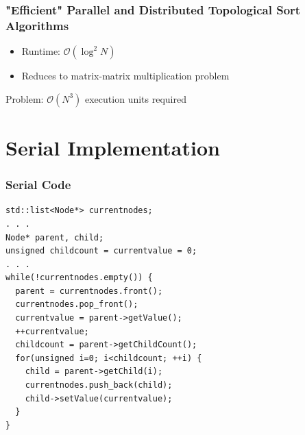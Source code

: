 \begin{frame}
\frametitle{"Efficient" Parallel and Distributed Topological Sort Algorithms}

\begin{itemize}
	\item Runtime: $\mathcal{O} (\log^2 N)$
	\item Reduces to matrix-matrix multiplication problem
\end{itemize}

\begin{block}{Problem:}
	$\mathcal{O} (N^3)$ execution units required
\end{block}


\end{frame}




\section{Serial Implementation}

\begin{frame}[fragile]
	\frametitle{Serial Code}
	\begin{lstlisting}[style=cpp]
std::list<Node*> currentnodes;
. . .
Node* parent, child;
unsigned childcount = currentvalue = 0;
. . .
while(!currentnodes.empty()) {
  parent = currentnodes.front();
  currentnodes.pop_front();
  currentvalue = parent->getValue();
  ++currentvalue;
  childcount = parent->getChildCount();
  for(unsigned i=0; i<childcount; ++i) {
    child = parent->getChild(i);
    currentnodes.push_back(child);
    child->setValue(currentvalue);
  }
}
\end{lstlisting}
\end{frame}


